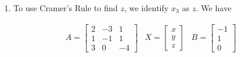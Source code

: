\documentclass{ximera}
\begin{document}
\begin{example}
\begin{enumerate}
\[ \begin{array}{cc}

A_{1} = \left[ \begin{array}{rr} 4 & -3 \\ -2 & 1 \\ \end{array} \right] 

&

\qquad A_2 = \left[ \begin{array}{rr} 2 & 4 \\ 5 & -2 \\ \end{array} \right] \\

\end{array} \]

Computing determinants, we get $\det(A) = 17$, $\det\left(A_{1}\right) = -2$ and  $\det\left(A_2\right) = -24$, so that

\[ \begin{array}{cc}

x_{1} = \frac{\det\left(A_{1}\right)}{\det(A)} = -\frac{2}{17} 
& 
\qquad x_2 = \frac{\det\left(A_2\right)}{\det(A)} = -\frac{24}{17} \\

\end{array} \]

The reader can check that the solution to the system is $\left(-\frac{2}{17}, -\frac{24}{17}\right)$.

\item To use Cramer's Rule to find $z$, we identify $x_3$ as $z$.  We have 

\[ \begin{array}{cccc}

A = \left[ \begin{array}{rrr} 2 & -3 & 1 \\ 1 & -1 & 1 \\ 3 & 0 & -4  \end{array} \right] 
&
 X = \left[ \begin{array}{r} x \\ y \\ z \end{array} \right] 
& 
B = \left[ \begin{array}{r} -1 \\ 1 \\ 0 \end{array} \right] 

&


\end{array}\]
\end{enumerate}
\end{example}
\end{document}
